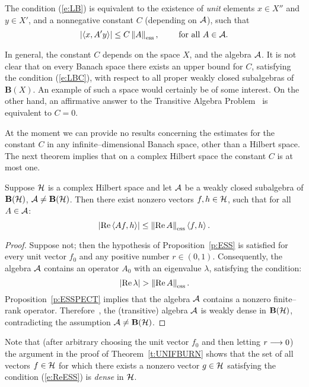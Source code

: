 \medskip

The condition (\ref{e:LB}) is equivalent to the existence of {\em unit}
elements $x\in{X''}$ and $y\in{X'}$, and a nonnegative constant $C$
(depending on ${\cal A}$), such that
\begin{equation}\label{e:LBC}
 \abs{\seq{x,A'y}}\leq C \essnorm{A}, \qquad \text{ for all $A\in\A$}.
\end{equation}

In general, the constant $C$ depends on the space $X$, and the algebra ${\cal A}$.
It is not clear that on every Banach space there exists an upper bound for
$C$, satisfying the condition (\ref{e:LBC}), with respect to all proper
weakly closed subalgebras of $\mathbf{B}(X)$. An example of such a space
would certainly be of some interest. On the other hand, an affirmative answer
to the Transitive Algebra Problem~\cite{RR73} is equivalent to $C=0$.

\medskip

At the moment we can provide no results concerning the estimates for the
constant $C$ in any infinite--dimensional Banach space, other than a Hilbert
space. The next theorem implies that on a complex Hilbert space the constant
$C$ is at most one.

\begin{thm}\label{t:UNIFBURN}
Suppose ${\cal H}$ is a complex Hilbert space and let ${\cal A}$ be a weakly closed
subalgebra of $\mathbf B(\cal H)$, ${\cal A}\neq\mathbf B(\cal H)$. Then there exist nonzero vectors
$f,h\in{\cal H}$, such that for all $A\in{\cal A}$:
\begin{equation}\label{e:ReESS}
  \abs{\RE\seq{A f,h}}\leq\essnorm{\RE A}\seq{f,h}.
\end{equation}
\end{thm}

\begin{proof}
Suppose not; then the hypothesis of Proposition~\ref{p:ESS} is satisfied for
every unit vector $f_0$ and any positive number $r\in(0,1)$. Consequently,
the algebra ${\cal A}$ contains an operator $A_0$ with an eigenvalue $\lambda$,
satisfying the condition:
\[ \abs{\RE\lambda}>\essnorm{\RE{A}}. \]
Proposition~\ref{p:ESSPECT} implies that the algebra ${\cal A}$ contains a nonzero
finite--rank operator. Therefore~\cite[Theorem~8.2]{RR73}, the (transitive)
algebra ${\cal A}$ is weakly dense in $\mathbf B(\cal H)$, contradicting the assumption
${\cal A}\neq\mathbf B(\cal H)$.
\end{proof}

\begin{rem}
Note that (after arbitrary choosing the unit vector $f_0$ and then letting
$r\longrightarrow0$) the argument in the proof of Theorem~\ref{t:UNIFBURN} shows that the
set of all vectors $f\in{\cal H}$ for which there exists a nonzero vector $g\in{\cal H}$
satisfying the condition (\ref{e:ReESS}) is {\em dense} in ${\cal H}$.
\end{rem}

